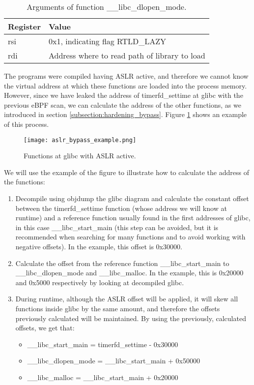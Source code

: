 \begin{table}[htbp]
\begin{tabular}{|>{\centering\arraybackslash}p{4cm}|>{\centering\arraybackslash}p{10cm}|}
\hline
Register & Value\\
\hline
\hline
rsi & 0x1, indicating flag RTLD\_LAZY\\
\hline
rdi & Address where to read path of library to load\\
\hline
\end{tabular}
\caption{Arguments of function \_\_libc\_dlopen\_mode.}
\label{table:libc_dlopen_mode}
\end{table}

The programs were compiled having ASLR active, and therefore we cannot know the virtual address at which these functions are loaded into the process memory. However, since we have leaked the address of timerfd\_settime at glibc with the previous eBPF scan, we can calculate the address of the other functions, as we introduced in section \ref{subsection:hardening_bypass}. Figure \ref{fig:aslr_bypass_example} shows an example of this process.

\begin{figure}[htbp]
	\centering
	\texttt{[image: aslr\_bypass\_example.png]}
	\caption{Functions at glibc with ASLR active.}
	\label{fig:aslr_bypass_example}
\end{figure}

We will use the example of the figure to illustrate how to calculate the address of the functions:
\begin{enumerate}
\item Decompile using objdump the glibc diagram and calculate the constant offset between the timerfd\_settime function (whose address we will know at runtime) and a reference function usually found in the first addresses of glibc, in this case \_\_libc\_start\_main (this step can be avoided, but it is recommended when searching for many functions and to avoid working with negative offsets). In the example, this offset is 0x30000.
\item Calculate the offset from the reference function \_\_libc\_start\_main to \_\_libc\_dlopen\_mode and \_\_libc\_malloc. In the example, this is 0x20000 and 0x5000 respectively by looking at  decompiled glibc.
\item During runtime, although the ASLR offset will be applied, it will skew all functions inside glibc by the same amount, and therefore the offsets previously calculated will be maintained. By using the previously, calculated offsets, we get that:
\begin{itemize}
	\item \_\_libc\_start\_main = timerfd\_settime - 0x30000
	\item \_\_libc\_dlopen\_mode = \_\_libc\_start\_main + 0x50000
	\item \_\_libc\_malloc = \_\_libc\_start\_main + 0x20000
\end{itemize}
\end{enumerate}

